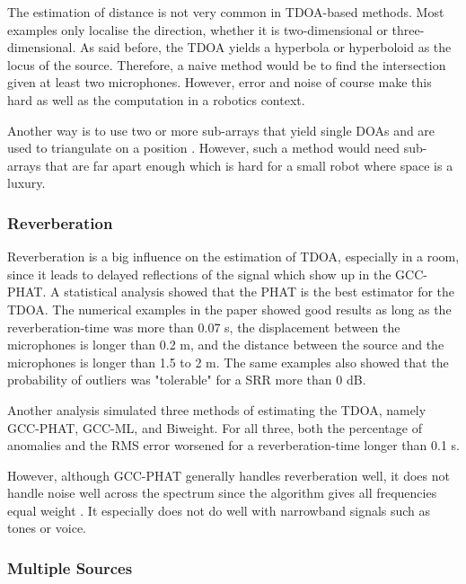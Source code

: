 \documentclass{report}
\begin{document}
The estimation of distance is not very common in TDOA-based methods. Most examples only localise the direction, whether it is two-dimensional or three-dimensional. As said before, the TDOA yields a hyperbola or hyperboloid as the locus of the source. Therefore, a naive method would be to find the intersection given at least two microphones. However, error and noise of course make this hard as well as the computation in a robotics context.

Another way is to use two or more sub-arrays that yield single DOAs and are used to triangulate on a position \cite{rascon_localization_2017}. However, such a method would need sub-arrays that are far apart enough which is hard for a small robot where space is a luxury.


\subsubsection{Reverberation}

Reverberation is a big influence on the estimation of TDOA, especially in a room, since it leads to delayed reflections of the signal which show up in the GCC-PHAT. A statistical analysis \cite{gustafsson_source_2003} showed that the PHAT is the best estimator for the TDOA. The numerical examples in the paper showed good results as long as the reverberation-time was more than 0.07 \si{s}, the displacement between the microphones is longer than 0.2 \si{m}, and the distance between the source and the microphones is longer than 1.5 to 2 \si{m}. The same examples also showed that the probability of outliers was "tolerable" for a SRR more than 0 \si{dB}.

Another analysis \cite{brandstein_robust_1997} simulated three methods of estimating the TDOA, namely GCC-PHAT, GCC-ML, and Biweight. For all three, both the percentage of anomalies and the RMS error worsened for a reverberation-time longer than 0.1 \si{s}.

However, although GCC-PHAT generally handles reverberation well, it does not handle noise well across the spectrum since the algorithm gives all frequencies equal weight \cite{valin_robust_2003}. It especially does not do well with narrowband signals such as tones or voice.

\subsubsection{Multiple Sources}
\end{document}
